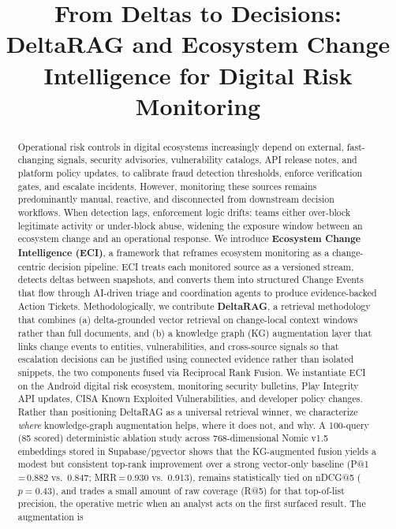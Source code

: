 \documentclass[
]{article}
\title{From Deltas to Decisions: DeltaRAG and Ecosystem Change\\Intelligence for Digital Risk Monitoring}
\author{}
\date{}
\begin{document}
\maketitle

\begin{abstract}
Operational risk controls in digital ecosystems increasingly depend on
external, fast-changing signals, security advisories, vulnerability
catalogs, API release notes, and platform policy updates, to calibrate
fraud detection thresholds, enforce verification gates, and escalate
incidents. However, monitoring these sources remains predominantly
manual, reactive, and disconnected from downstream decision workflows.
When detection lags, enforcement logic drifts: teams either over-block
legitimate activity or under-block abuse, widening the exposure window
between an ecosystem change and an operational response. We introduce
\textbf{Ecosystem Change Intelligence (ECI)}, a framework that reframes
ecosystem monitoring as a change-centric decision pipeline. ECI treats
each monitored source as a versioned stream, detects deltas between
snapshots, and converts them into structured Change Events that flow
through AI-driven triage and coordination agents to produce
evidence-backed Action Tickets. Methodologically, we contribute
\textbf{DeltaRAG}, a retrieval methodology that combines (a)
delta-grounded vector retrieval on change-local context windows rather
than full documents, and (b) a knowledge graph (KG) augmentation layer
that links change events to entities, vulnerabilities, and cross-source
signals so that escalation decisions can be justified using connected
evidence rather than isolated snippets, the two components fused via
Reciprocal Rank Fusion. We instantiate ECI on the Android digital risk
ecosystem, monitoring security bulletins, Play Integrity API updates,
CISA Known Exploited Vulnerabilities, and developer policy changes.
Rather than positioning DeltaRAG as a universal retrieval winner, we
characterize \emph{where} knowledge-graph augmentation helps, where it
does not, and why. A 100-query (85 scored) deterministic ablation study
across 768-dimensional Nomic v1.5 embeddings stored in Supabase/pgvector
shows that the KG-augmented fusion yields a modest but consistent
top-rank improvement over a strong vector-only baseline
(P@1\,=\,0.882 vs.\ 0.847; MRR\,=\,0.930 vs.\ 0.913), remains
statistically tied on nDCG@5 ($p = 0.43$), and trades a small amount of
raw coverage (R@5) for that top-of-list precision, the operative metric
when an analyst acts on the first surfaced result. The augmentation is

\end{abstract}
\end{document}
